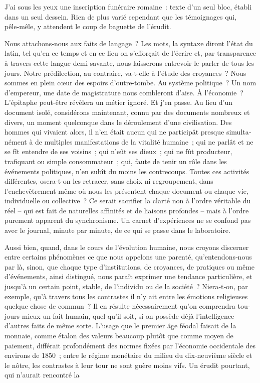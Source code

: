 \documentclass[french,twoside]{book} %
\begin{document}
\noindent  {}
\label{p73} J’ai sous les yeux une inscription funéraire romaine : texte d’un seul bloc, établi dans un seul dessein. Rien de plus varié cependant que les témoignages qui, pêle‑mêle, y attendent le coup de baguette de l’érudit.\par
Nous attachons‑nous aux faits de langage ? Les mots, la syntaxe diront l’état du latin, tel qu’en ce temps et en ce lieu on s’efforçait de l’écrire et, par transparence à travers cette langue demi-savante, nous laisserons entrevoir le parler de tous les jours. Notre prédilection, au contraire, va‑t‑elle à l’étude des croyances ? Nous sommes en plein cœur des espoirs d’outre‑tombe. Au système politique ? Un nom d’empereur, une date de magistrature nous combleront d’aise. À l’économie ? L’épitaphe peut-être révèlera un métier ignoré. Et j’en passe. Au lieu d’un document isolé, considérons maintenant, connu par des documents nombreux et divers, un moment quelconque dans le déroulement d’une civilisation. Des hommes qui vivaient alors, il n’en était aucun qui ne participât presque simulta­nément à de multiples manifestations de la vitalité humaine ; qui ne parlât et ne se fît entendre de ses voisins ; qui n’eût ses dieux ; qui ne fût producteur, trafiquant ou simple consommateur ; qui, faute de tenir un rôle dans les événements politiques, n’en subît du moins les contre­coups. Toutes ces activités différentes, osera‑t‑on les retracer, sans choix ni regroupement, dans l’enchevêtrement même où nous les présentent chaque document ou chaque vie, individuelle ou collective ? Ce serait sacrifier la clarté non à l’ordre véritable du réel – qui est fait de naturelles affinités et de liaisons profondes – mais à l’ordre purement apparent du synchronisme. Un carnet d’expériences ne se confond pas avec le journal, minute par minute, de ce qui se passe dans le laboratoire.\par
Aussi bien, quand, dans le cours de l’évolution humaine, nous croyons discerner entre certains phénomènes ce que nous appelons une parenté, qu’entendons‑nous par là, sinon, que chaque type d’institutions, de croyances, de pratiques ou même d’événements, ainsi distingué, nous paraît exprimer une tendance particulière, et jusqu’à un certain point, stable, de l’individu ou de la société ? Niera‑t‑on, par exemple, qu’à travers tous les contrastes il n’y ait entre les émotions religieuses quelque chose de commun ? Il en résulte nécessairement qu’on comprendra tou­jours mieux un fait humain, quel qu’il soit, si on possède déjà l’intelligence d’autres faits de même sorte. L’usage que le premier âge féodal faisait de la monnaie, comme étalon des valeurs beaucoup plutôt que comme moyen de paiement, différait profondément des normes fixées par l’éco­nomie occidentale des environs de 1850 ; entre le régime monétaire du milieu du dix‑neuvième siècle et le nôtre, les contrastes à leur tour ne sont guère moins vifs. Un érudit pourtant, qui n’aurait rencontré la  
\end{document}
